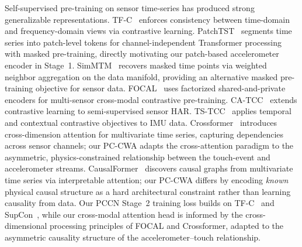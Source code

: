Self-supervised pre-training on sensor time-series has produced strong generalizable
representations.%
TF-C~\cite{tfc2022} enforces consistency between time-domain and frequency-domain views
via contrastive learning.%
PatchTST~\cite{patchtst2023} segments time series into patch-level tokens for
channel-independent Transformer processing with masked pre-training, directly
motivating our patch-based accelerometer encoder in Stage~1.%
SimMTM~\cite{simmtm2023} recovers masked time points via weighted neighbor aggregation
on the data manifold, providing an alternative masked pre-training objective for
sensor data.%
FOCAL~\cite{focal2023} uses factorized shared-and-private encoders for multi-sensor
cross-modal contrastive pre-training.%
CA-TCC~\cite{catcc2023} extends contrastive learning to semi-supervised sensor HAR.%
TS-TCC~\cite{tstcc2021} applies temporal and contextual contrastive objectives to IMU data.%
Crossformer~\cite{crossformer2023} introduces cross-dimension attention for multivariate
time series, capturing dependencies across sensor channels; our PC-CWA adapts the
cross-attention paradigm to the asymmetric, physics-constrained relationship between
the touch-event and accelerometer streams.%
CausalFormer~\cite{causalformer2024} discovers causal graphs from multivariate time
series via interpretable attention; our PC-CWA differs by encoding \textit{known}
physical causal structure as a hard architectural constraint rather than learning
causality from data.%
Our PCCN Stage~2 training loss builds on TF-C~\cite{tfc2022} and SupCon~\cite{supcon2020},
while our cross-modal attention head is informed by the cross-dimensional processing
principles of FOCAL and Crossformer, adapted to the asymmetric causality structure
of the accelerometer--touch relationship.%
